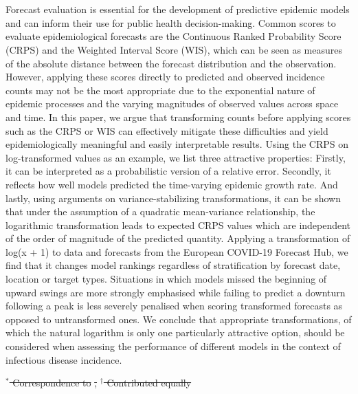 \documentclass[10pt,letterpaper]{article} %
\providecommand{\DIFaddtex}[1]{{\protect\color{blue}\uwave{#1}}} %
\providecommand{\DIFdeltex}[1]{{\protect\color{red}\sout{#1}}}                      %
\providecommand{\DIFaddend}{} %
\providecommand{\DIFdelbegin}{} %
\providecommand{\DIFdelend}{} %
\providecommand{\DIFadd}[1]{\texorpdfstring{\DIFaddtex{#1}}{#1}} %
\providecommand{\DIFdel}[1]{\texorpdfstring{\DIFdeltex{#1}}{}} %
\newcommand{\DIFscaledelfig}{0.5}
\newlength{\DIFdelgraphicswidth} %
\newlength{\DIFdelgraphicsheight} %
\newcommand{\DIFdelincludegraphics}[2][]{%
\sbox{\DIFdelgraphicsbox}{\DIFOincludegraphics[#1]{#2}}%
\settoboxwidth{\DIFdelgraphicswidth}{\DIFdelgraphicsbox} %
\settoboxtotalheight{\DIFdelgraphicsheight}{\DIFdelgraphicsbox} %
\scalebox{\DIFscaledelfig}{%
\parbox[b]{\DIFdelgraphicswidth}{\usebox{\DIFdelgraphicsbox}\\[-\baselineskip] \rule{\DIFdelgraphicswidth}{0em}}\llap{\resizebox{\DIFdelgraphicswidth}{\DIFdelgraphicsheight}{%
\setlength{\unitlength}{\DIFdelgraphicswidth}%
\begin{picture}(1,1)%
\thicklines\linethickness{2pt} %
{\color[rgb]{1,0,0}\put(0,0){\framebox(1,1){}}}%
{\color[rgb]{1,0,0}\put(0,0){\line( 1,1){1}}}%
{\color[rgb]{1,0,0}\put(0,1){\line(1,-1){1}}}%
\end{picture}%
}\hspace*{3pt}}} %
} %
\DeclareRobustCommand{\DIFaddend}{\DIFOaddend \let\includegraphics\DIFOincludegraphics} %
\DeclareRobustCommand{\DIFdelbegin}{\DIFOdelbegin \let\includegraphics\DIFdelincludegraphics} %
\DeclareRobustCommand{\DIFdelend}{\DIFOaddend \let\includegraphics\DIFOincludegraphics} %
\begin{document}
\section*{\DIFadd{Abstract}}
\DIFaddend Forecast evaluation is essential for the development of predictive epidemic models and can inform their use for public health decision-making. Common scores to evaluate epidemiological forecasts are the Continuous Ranked Probability Score (CRPS) and the Weighted Interval Score (WIS), which can be seen as measures of the absolute distance between the forecast distribution and the observation. However, applying these scores directly to predicted and observed incidence counts may not be the most appropriate due to the exponential nature of epidemic processes and the varying magnitudes of observed values across space and time. In this paper, we argue that transforming counts before applying scores such as the CRPS or WIS can effectively mitigate these difficulties and yield epidemiologically meaningful and easily interpretable results. Using the CRPS on log-transformed values as an example, we list three attractive properties: Firstly, it can be interpreted as a probabilistic version of a relative error. Secondly, it reflects how well models predicted the time-varying epidemic growth rate. And lastly, using arguments on variance-stabilizing transformations, it can be shown that under the assumption of a quadratic mean-variance relationship, the logarithmic transformation leads to expected CRPS values which are independent of the order of magnitude of the predicted quantity. Applying a transformation of log(x + 1) to data and forecasts from the European COVID-19 Forecast Hub, we find that it changes model rankings regardless of stratification by forecast date, location or target types. Situations in which models missed the beginning of upward swings are more strongly emphasised while failing to predict a downturn following a peak is less severely penalised when scoring transformed forecasts as opposed to untransformed ones. We conclude that appropriate transformations, of which the natural logarithm is only one particularly attractive option, should be considered when assessing the performance of different models in the context of infectious disease incidence.
\DIFdelbegin %
\DIFdelend 


\DIFdelbegin %

\DIFdel{$^*$ Correspondence to }%
\DIFdel{, 
}%
\DIFdel{$^\dagger$ Contributed equally}%
\end{document}
